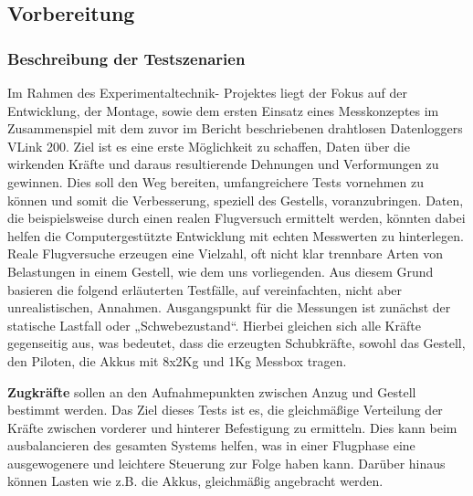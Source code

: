 \subsection{Vorbereitung}
\subsubsection{Beschreibung der Testszenarien}
Im Rahmen des Experimentaltechnik- Projektes liegt der Fokus auf der Entwicklung, der Montage, sowie dem ersten Einsatz eines Messkonzeptes im Zusammenspiel mit dem zuvor im Bericht beschriebenen drahtlosen Datenloggers VLink 200.
Ziel ist es eine erste Möglichkeit zu schaffen, Daten über die wirkenden Kräfte und daraus resultierende Dehnungen und Verformungen zu gewinnen.
Dies soll den Weg bereiten, umfangreichere Tests vornehmen zu können und somit die Verbesserung, speziell des Gestells, voranzubringen.
Daten, die beispielsweise durch einen realen Flugversuch ermittelt werden, könnten dabei helfen die Computergestützte Entwicklung mit echten Messwerten zu hinterlegen.
Reale Flugversuche erzeugen eine Vielzahl, oft nicht klar trennbare Arten von Belastungen in einem Gestell, wie dem uns vorliegenden.
Aus diesem Grund basieren die folgend erläuterten Testfälle, auf vereinfachten, nicht aber unrealistischen, Annahmen. 
Ausgangspunkt für die Messungen ist zunächst der statische Lastfall oder „Schwebezustand“.
Hierbei gleichen sich alle Kräfte gegenseitig aus, was bedeutet, dass die erzeugten Schubkräfte, sowohl das Gestell, den Piloten, die Akkus mit 8x2Kg und 1Kg Messbox tragen. 

\textbf{Zugkräfte} sollen an den Aufnahmepunkten zwischen Anzug und Gestell bestimmt werden.
Das Ziel dieses Tests ist es, die gleichmäßige Verteilung der Kräfte zwischen vorderer und hinterer Befestigung zu ermitteln.
Dies kann beim ausbalancieren des gesamten Systems helfen, was in einer Flugphase eine ausgewogenere und leichtere Steuerung zur Folge haben kann.
Darüber hinaus können Lasten wie z.B. die Akkus, gleichmäßig angebracht werden. 

